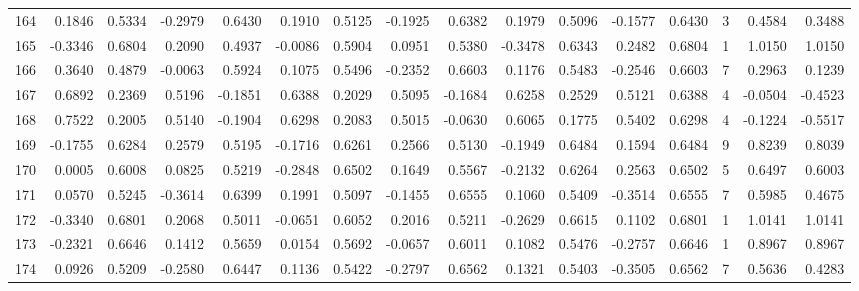 \begin{tabular}{lrrrrrrrrrrrrrrr}
164 &      0.1846 &  0.5334 & -0.2979 &  0.6430 &  0.1910 &  0.5125 & -0.1925 &  0.6382 &  0.1979 &  0.5096 &  -0.1577 &     0.6430 &      3 &                    0.4584 &                     0.3488 \\
165 &     -0.3346 &  0.6804 &  0.2090 &  0.4937 & -0.0086 &  0.5904 &  0.0951 &  0.5380 & -0.3478 &  0.6343 &   0.2482 &     0.6804 &      1 &                    1.0150 &                     1.0150 \\
166 &      0.3640 &  0.4879 & -0.0063 &  0.5924 &  0.1075 &  0.5496 & -0.2352 &  0.6603 &  0.1176 &  0.5483 &  -0.2546 &     0.6603 &      7 &                    0.2963 &                     0.1239 \\
167 &      0.6892 &  0.2369 &  0.5196 & -0.1851 &  0.6388 &  0.2029 &  0.5095 & -0.1684 &  0.6258 &  0.2529 &   0.5121 &     0.6388 &      4 &                   -0.0504 &                    -0.4523 \\
168 &      0.7522 &  0.2005 &  0.5140 & -0.1904 &  0.6298 &  0.2083 &  0.5015 & -0.0630 &  0.6065 &  0.1775 &   0.5402 &     0.6298 &      4 &                   -0.1224 &                    -0.5517 \\
169 &     -0.1755 &  0.6284 &  0.2579 &  0.5195 & -0.1716 &  0.6261 &  0.2566 &  0.5130 & -0.1949 &  0.6484 &   0.1594 &     0.6484 &      9 &                    0.8239 &                     0.8039 \\
170 &      0.0005 &  0.6008 &  0.0825 &  0.5219 & -0.2848 &  0.6502 &  0.1649 &  0.5567 & -0.2132 &  0.6264 &   0.2563 &     0.6502 &      5 &                    0.6497 &                     0.6003 \\
171 &      0.0570 &  0.5245 & -0.3614 &  0.6399 &  0.1991 &  0.5097 & -0.1455 &  0.6555 &  0.1060 &  0.5409 &  -0.3514 &     0.6555 &      7 &                    0.5985 &                     0.4675 \\
172 &     -0.3340 &  0.6801 &  0.2068 &  0.5011 & -0.0651 &  0.6052 &  0.2016 &  0.5211 & -0.2629 &  0.6615 &   0.1102 &     0.6801 &      1 &                    1.0141 &                     1.0141 \\
173 &     -0.2321 &  0.6646 &  0.1412 &  0.5659 &  0.0154 &  0.5692 & -0.0657 &  0.6011 &  0.1082 &  0.5476 &  -0.2757 &     0.6646 &      1 &                    0.8967 &                     0.8967 \\
174 &      0.0926 &  0.5209 & -0.2580 &  0.6447 &  0.1136 &  0.5422 & -0.2797 &  0.6562 &  0.1321 &  0.5403 &  -0.3505 &     0.6562 &      7 &                    0.5636 &                     0.4283 \\

\end{tabular}
